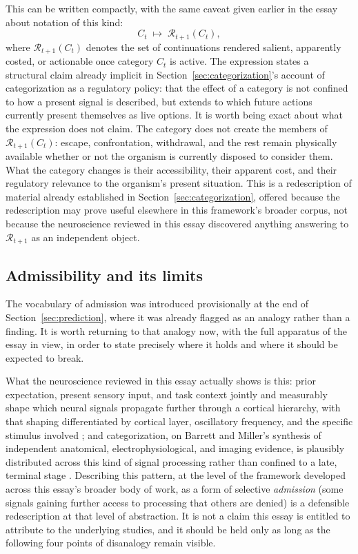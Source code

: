 \documentclass[11pt]{article}
\begin{document}
This can be written compactly, with the same caveat given earlier in the essay about notation of this kind:
\[
C_t \;\mapsto\; \mathcal{R}_{t+1}(C_t),
\]
where $\mathcal{R}_{t+1}(C_t)$ denotes the set of continuations rendered salient, apparently costed, or actionable once category $C_t$ is active. The expression states a structural claim already implicit in Section~\ref{sec:categorization}'s account of categorization as a regulatory policy: that the effect of a category is not confined to how a present signal is described, but extends to which future actions currently present themselves as live options. It is worth being exact about what the expression does not claim. The category does not create the members of $\mathcal{R}_{t+1}(C_t)$: escape, confrontation, withdrawal, and the rest remain physically available whether or not the organism is currently disposed to consider them. What the category changes is their accessibility, their apparent cost, and their regulatory relevance to the organism's present situation. This is a redescription of material already established in Section~\ref{sec:categorization}, offered because the redescription may prove useful elsewhere in this framework's broader corpus, not because the neuroscience reviewed in this essay discovered anything answering to $\mathcal{R}_{t+1}$ as an independent object.

\subsection{Admissibility and its limits}

The vocabulary of admission was introduced provisionally at the end of Section~\ref{sec:prediction}, where it was already flagged as an analogy rather than a finding. It is worth returning to that analogy now, with the full apparatus of the essay in view, in order to state precisely where it holds and where it should be expected to break.

What the neuroscience reviewed in this essay actually shows is this: prior expectation, present sensory input, and task context jointly and measurably shape which neural signals propagate further through a cortical hierarchy, with that shaping differentiated by cortical layer, oscillatory frequency, and the specific stimulus involved \citep{Bastos2020}; and categorization, on Barrett and Miller's synthesis of independent anatomical, electrophysiological, and imaging evidence, is plausibly distributed across this kind of signal processing rather than confined to a late, terminal stage \citep{BarrettMiller2026}. Describing this pattern, at the level of the framework developed across this essay's broader body of work, as a form of selective \emph{admission} (some signals gaining further access to processing that others are denied) is a defensible redescription at that level of abstraction. It is not a claim this essay is entitled to attribute to the underlying studies, and it should be held only as long as the following four points of disanalogy remain visible.
\end{document}
